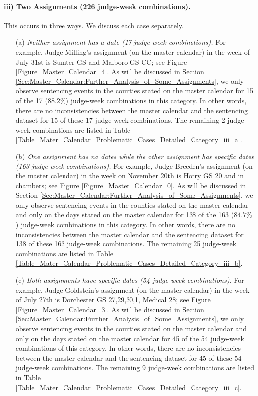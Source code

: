 \documentclass[11pt, oneside]{article}   	%
\theoremstyle{ModifiedStyle}
\begin{document}
\paragraph{iii) Two Assignments (226 judge-week combinations).}
\label{Category_iii}
This occurs in three ways. We discuss each case separately.
	\begin{itemize}
		\item[(a)] \emph{Neither assignment has a date (17 judge-week combinations).} For example, Judge Milling's assignment (on the master calendar) in the week of July 31st is Sumter GS and Malboro GS CC; see Figure \ref{Figure_Master_Calendar_4}. As will be discussed in Section \ref{Sec:Master_Calendar:Further_Analysis_of_Some_Assignments}, we only observe sentencing events in the counties stated on the master calendar for 15 of the 17 ($88.2\%$) judge-week combinations in this category. In other words, there are no inconsistencies between the master calendar and the sentencing dataset for 15 of these 17 judge-week combinations. The remaining 2 judge-week combinations are listed in Table \ref{Table_Mater_Calendar_Problematic_Cases_Detailed_Category_iii_a}.
		\item[(b)] \emph{One assignment has no dates while the other assignment has specific dates (163 judge-week combinations).} For example, Judge Breeden's assignment (on the master calendar) in the week on November 20th is Horry GS 20 and in chambers; see Figure \ref{Figure_Master_Calendar_0}. As will be discussed in Section \ref{Sec:Master_Calendar:Further_Analysis_of_Some_Assignments}, we only observe sentencing events in the counties stated on the master calendar and only on the days stated on the master calendar for 138 of the 163 ($84.7\%$) judge-week combinations in this category. In other words, there are no inconsistencies between the master calendar and the sentencing dataset for 138 of these 163 judge-week combinations. The remaining 25 judge-week combinations are listed in Table \ref{Table_Mater_Calendar_Problematic_Cases_Detailed_Category_iii_b}.
		\item[(c)] \emph{Both assignments have specific dates (54 judge-week combinations).} For example, Judge Goldstein's assignment (on the master calendar) in the week of July 27th is Dorchester GS 27,29,30,1, Medical 28; see Figure \ref{Figure_Master_Calendar_3}. As will be discussed in Section \ref{Sec:Master_Calendar:Further_Analysis_of_Some_Assignments}, we only observe sentencing events in the counties stated on the master calendar and only on the days stated on the master calendar for 45 of the 54 judge-week combinations of this category. In other words, there are no inconsistencies between the master calendar and the sentencing dataset for 45 of these 54 judge-week combinations. The remaining 9 judge-week combinations are listed in Table \ref{Table_Mater_Calendar_Problematic_Cases_Detailed_Category_iii_c}.
	\end{itemize}
\end{document}
